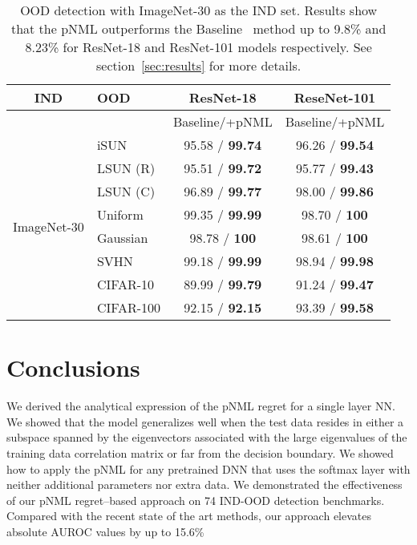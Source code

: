 \documentclass{article}
\def\secref#1{section~\ref{#1}}
\begin{document}
\begin{table}[t]
\centering
\small
\caption{OOD detection with ImageNet-30 as the IND set. Results show that the pNML outperforms the Baseline~\citep{hendrycks17baseline} method up to 9.8\% and 8.23\% for ResNet-18 and ResNet-101 models respectively. See \secref{sec:results} for more details.}
\label{tab:aruoc_imagnet30}
\vspace{0.1mm}
\begin{tabular}{clcc}
\toprule
IND & OOD &        ResNet-18 &   ReseNet-101  \\
\midrule 
 & & Baseline/+pNML & Baseline/+pNML \\ \cmidrule{3-4} 
\multirow{8}{*}{ImageNet-30} 
    & iSUN      &  95.58 / \textbf{99.74}   &  96.26 / \textbf{99.54}   \\
    & LSUN (R)  &  95.51 / \textbf{99.72}   &  95.77 / \textbf{99.43}   \\
    & LSUN (C)  &  96.89 / \textbf{99.77}   &  98.00 / \textbf{99.86}   \\
    & Uniform   &  99.35 / \textbf{99.99}   &   98.70 / \textbf{100}    \\
    & Gaussian  &  98.78 / \textbf{100}     &   98.61 / \textbf{100}    \\
    & SVHN      &  99.18 / \textbf{99.99}   &  98.94 / \textbf{99.98}   \\
    & CIFAR-10  &  89.99 / \textbf{99.79}   &   91.24 / \textbf{99.47}  \\
    & CIFAR-100 &  92.15 / \textbf{92.15}   &  93.39 / \textbf{99.58}   \\
\bottomrule
\end{tabular}
 \end{table}



\section{Conclusions}
\label{sec:conclusions}
We derived the analytical expression of the pNML regret for a single layer NN. 
We showed that the model generalizes well when the test data resides in either a subspace spanned by the eigenvectors associated with the large eigenvalues of the training data correlation matrix or far from the decision boundary.
We showed how to apply the pNML for any pretrained DNN that uses the softmax layer with neither additional parameters nor extra data.
We demonstrated the effectiveness of our pNML regret--based approach on 74 IND-OOD detection benchmarks. Compared with the recent state of the art methods, our approach elevates absolute AUROC values by up to 15.6\%
\end{document}
